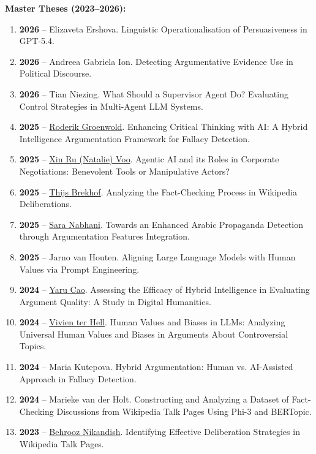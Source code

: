 \textbf{Master Theses (2023--2026):}
\begin{enumerate}
\item \textbf{2026} -- Elizaveta Ershova. Linguistic Operationalisation of Persuasiveness in GPT-5.4.
\item \textbf{2026} -- Andreea Gabriela Ion. Detecting Argumentative Evidence Use in Political Discourse.
\item \textbf{2026} -- Tian Niezing. What Should a Supervisor Agent Do? Evaluating Control Strategies in Multi-Agent LLM Systems.
\item \textbf{2025} -- \href{https://arts.studenttheses.ub.rug.nl/37751/}{Roderik Groenwold}. Enhancing Critical Thinking with AI: A Hybrid Intelligence Argumentation Framework for Fallacy Detection.
\item \textbf{2025} -- \href{https://arts.studenttheses.ub.rug.nl/37658/}{Xin Ru (Natalie) Voo}. Agentic AI and its Roles in Corporate Negotiations: Benevolent Tools or Manipulative Actors?
\item \textbf{2025} -- \href{https://arts.studenttheses.ub.rug.nl/36552/}{Thijs Brekhof}. Analyzing the Fact-Checking Process in Wikipedia Deliberations.
\item \textbf{2025} -- \href{https://arts.studenttheses.ub.rug.nl/36170/}{Sara Nabhani}. Towards an Enhanced Arabic Propaganda Detection through Argumentation Features Integration.
\item \textbf{2025} -- Jarno van Houten. Aligning Large Language Models with Human Values via Prompt Engineering.
\item \textbf{2024} -- \href{https://arts.studenttheses.ub.rug.nl/34961/}{Yaru Cao}. Assessing the Efficacy of Hybrid Intelligence in Evaluating Argument Quality: A Study in Digital Humanities.
\item \textbf{2024} -- \href{https://arts.studenttheses.ub.rug.nl/34750/}{Vivien ter Hell}. Human Values and Biases in LLMs: Analyzing Universal Human Values and Biases in Arguments About Controversial Topics.
\item \textbf{2024} -- Maria Kutepova. Hybrid Argumentation: Human vs. AI-Assisted Approach in Fallacy Detection.
\item \textbf{2024} -- Marieke van der Holt. Constructing and Analyzing a Dataset of Fact-Checking Discussions from Wikipedia Talk Pages Using Phi-3 and BERTopic.
\item \textbf{2023} -- \href{https://arts.studenttheses.ub.rug.nl/32234/}{Behrooz Nikandish}. Identifying Effective Deliberation Strategies in Wikipedia Talk Pages.
\end{enumerate}

